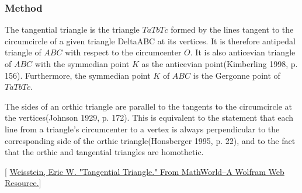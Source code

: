 
\subsubsection{Method } %
\label{ssub:method_triangle_tangential}

The tangential triangle is the triangle $TaTbTc$ formed by the lines tangent to the circumcircle of a given triangle DeltaABC at its vertices. It is therefore antipedal triangle of $ABC$ with respect to the circumcenter $O$. It is also anticevian triangle of $ABC$ with the symmedian point $K$ as the anticevian point(Kimberling 1998, p. 156). Furthermore, the symmedian point $K$ of $ABC$ is the Gergonne point of $TaTbTc$.

The sides of an orthic triangle are parallel to the tangents to the circumcircle at the vertices(Johnson 1929, p. 172). This is equivalent to the statement that each line from a triangle's circumcenter to a vertex is always perpendicular to the corresponding side of the orthic triangle(Honsberger 1995, p. 22), and to the fact that the orthic and tangential triangles are homothetic.
\begin{flushright}
  \small
[ \href{https://mathworld.wolfram.com/TangentialTriangle.html}{Weisstein, Eric W. "Tangential Triangle." From MathWorld--A Wolfram Web Resource.}]
\end{flushright}

\vspace{1em}
\begin{minipage}{.5\textwidth}
\begin{center}
\end{center}

\end{minipage}
\begin{minipage}{.5\textwidth}
\begin{tkzexample}
\end{tkzexample}
\end{minipage}

